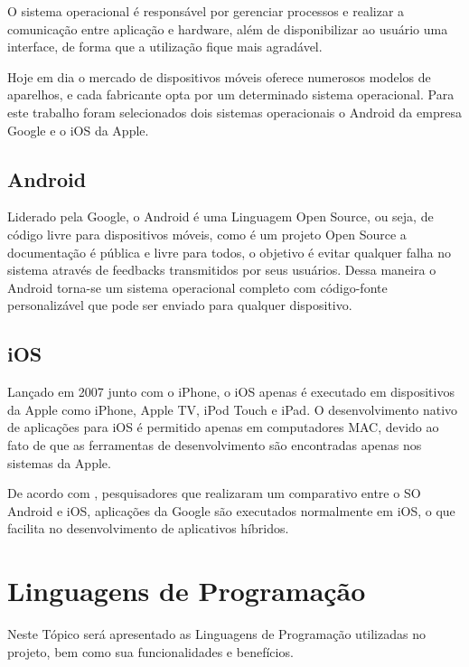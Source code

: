 O sistema operacional é responsável por gerenciar processos e realizar a comunicação entre aplicação e hardware, além de disponibilizar ao usuário uma interface, de forma que a utilização fique mais agradável. \cite {velloso2014informatica}

Hoje em dia o mercado de dispositivos móveis oferece numerosos modelos de aparelhos, e cada fabricante opta por um determinado sistema operacional. Para este trabalho foram selecionados dois sistemas operacionais o Android da empresa Google e o iOS da Apple. 

\subsection{Android}

Liderado pela Google, o Android é uma Linguagem Open Source, ou seja, de código livre para dispositivos móveis, como é um projeto Open Source a documentação é pública e livre para todos, o objetivo é evitar qualquer falha no sistema através de feedbacks transmitidos por seus usuários. Dessa maneira o Android torna-se um sistema operacional completo com código-fonte personalizável que pode ser enviado para qualquer dispositivo.


\subsection{iOS}

Lançado em 2007 junto com o iPhone, o iOS apenas é executado em dispositivos da Apple como iPhone, Apple TV, iPod Touch e iPad. O desenvolvimento nativo de aplicações para iOS é permitido apenas em computadores MAC, devido ao fato de que as ferramentas de desenvolvimento são encontradas apenas nos sistemas da Apple.\cite{garbin2014sistema}

De acordo com , pesquisadores que realizaram um comparativo entre o SO Android e iOS, aplicações da Google são executados normalmente em iOS, o que facilita no desenvolvimento de aplicativos híbridos.

\section{Linguagens de Programação}	

Neste Tópico será apresentado as Linguagens de Programação utilizadas no projeto, bem como sua funcionalidades e benefícios.

